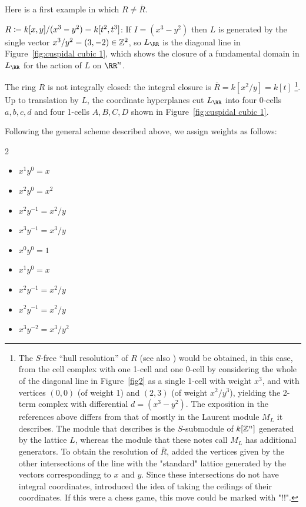 \documentclass{amsart}
\begin{document}
Here is a first example in which $R \neq \overline R$.

\begin{example} 
  \label{ex:cuspidal-cubic}
  $R\coloneqq k[x,y]/(x^3-y^2) = k[t^{2},t^{3}]$:
If $I = (x^3-y^2)$ then $L$ is generated by the single vector
$x^3/y^2 = (3,-2) \in \mathbb Z^2$, so
$L_\RR$ is the diagonal line in Figure~\ref{fig:cuspidal cubic 1}, which
shows the closure of a fundamental domain in $L_\RR$ for the action of $L$
on $\RR^n$.

The ring $R$ is not integrally closed: the integral closure is $\overline R = k[x^{2}/y] = k[t]$
\footnote{The $S$-free ``hull resolution'' of $R$ \cite[Section 3]{Bayer-Sturmfels} (see also \cite[Sections 9.2--9.3]{MScomb}) would be obtained, in this case, from the cell complex with one 1-cell and one 0-cell by considering the whole of the diagonal line in Figure~\ref{fig2} as a single 1-cell with weight $x^3$, and with vertices
$(0,0)$ (of weight 1) and $(2,3)$ (of weight $x^2/y^3$), yielding the 2-term complex with differential
$d = (x^3-y^2)$.
The exposition in the references above differs from
that of \cite{BCHSY} mostly in the Laurent module $M_L$ it describes. The module that \cite{Bayer-Sturmfels} describes is the $S$-submodule of $k[\mathbb Z^n]$ generated by the lattice $L$, whereas the module that these notes call $M_L$ has additional generators.
To obtain the resolution of $\overline R$, \cite{BCHSY} added the vertices given by
the other intersections of the line with the "standard" lattice generated
by the vectors correspondingg to $x$ and $y$. Since these intersections do not have integral coordinates, \cite{BCHSY} introduced the idea of taking the ceilings of 
their coordinates. 
If this were a chess game, this move could be marked with "!!".}.
Up to translation by $L$, the coordinate hyperplanes cut $L_\RR$ into four 0-cells $a,b,c,d$ and four 1-cells $A,B,C,D$ shown in Figure~\ref{fig:cuspidal cubic 1}.

\goodbreak


Following the general scheme described above, we assign weights as follows:
\begin{multicols}{2}
  \begin{itemize}
  \item[$\Psi(A)$:] $x^1y^0 = x$
  \item[$\Psi(B)$:] $x^2y^0 = x^2$
  \item[$\Psi(C)$:] $x^2y^{-1} = x^2/y$
  \item[$\Psi(D)$:] $x^3y^{-1} = x^3/y$
    \smallskip
  \item[$\Psi(a)$:] $x^0y^0 = 1$
  \item[$\Psi(b)$:] $x^1y^0 = x$
  \item[$\Psi(c)$:] $x^2y^{-1} = x^2/y$
  \item[$\Psi(d)$:] $x^2y^{-1} = x^2/y$
  \item[$\Psi(e)$:] $x^3y^{-2} = x^3/y^{2}$
  \end{itemize}
\end{multicols}


\end{example}
\end{document}
